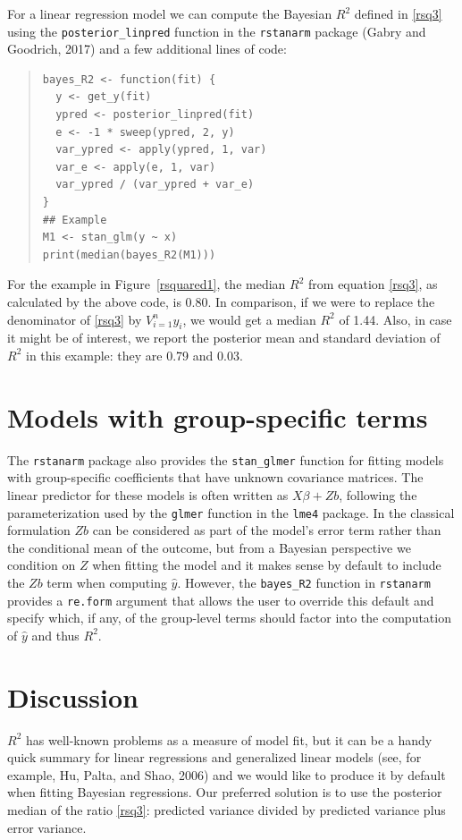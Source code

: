 \documentclass[11pt]{article}
\begin{document}
For a linear regression model we can compute the Bayesian $R^2$ defined in
\eqref{rsq3} using the \verb#posterior_linpred# function in the {\tt rstanarm}
package (Gabry and Goodrich, 2017) and a few additional lines of code:
%
\vspace{-\baselineskip}
\begin{quotation}
\noindent
\begin{small}
\begin{verbatim}
bayes_R2 <- function(fit) {
  y <- get_y(fit)
  ypred <- posterior_linpred(fit)
  e <- -1 * sweep(ypred, 2, y)
  var_ypred <- apply(ypred, 1, var)
  var_e <- apply(e, 1, var)
  var_ypred / (var_ypred + var_e)
}
## Example
M1 <- stan_glm(y ~ x)
print(median(bayes_R2(M1)))
\end{verbatim}
\end{small}
\end{quotation}
%
For the example in Figure~\ref{rsquared1}, the median $R^2$ from
equation \eqref{rsq3}, as calculated by the above code, is 0.80.  In comparison,
if we were to replace the denominator of \eqref{rsq3} by $V_{i=1}^n y_i$, we
would get a median $R^2$ of 1.44.  Also, in case it might be of interest, we
report the posterior mean and standard deviation of $R^2$ in this example:
they are 0.79 and 0.03.

\section{Models with group-specific terms}
The {\tt rstanarm} package also provides the \verb#stan_glmer# function for 
fitting models with group-specific coefficients that have unknown covariance matrices.
The linear predictor for these models is often written as $X \beta + Zb$, following
the parameterization used by the \verb#glmer# function in the {\tt lme4} package.
In the classical formulation $Zb$ can be considered as part of the model's error term
rather than the conditional mean of the outcome, but from a Bayesian perspective we 
condition on $Z$ when fitting the model and it makes sense by default to include the $Zb$ 
term when computing $\hat{y}$. However, the \verb#bayes_R2# function in {\tt rstanarm} 
provides a {\tt re.form} argument that allows the user to override this default and specify which, 
if any, of the group-level terms should factor into the computation of $\hat{y}$ and thus $R^2$.

\section{Discussion}
$R^2$ has well-known problems as a measure of model fit, but it can be a handy
quick summary for linear regressions and generalized linear models (see, for
example, Hu, Palta, and Shao, 2006) and we would like to produce it by default
when fitting Bayesian regressions.  Our preferred solution is to use the
posterior median of the ratio \eqref{rsq3}:  predicted variance divided by
predicted variance plus error variance.
\end{document}
